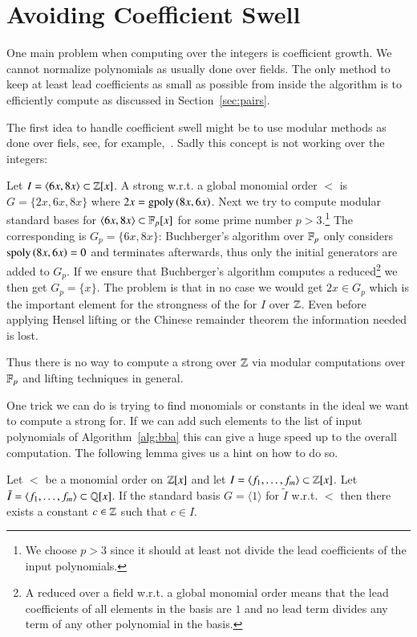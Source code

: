 \section{Avoiding Coefficient Swell}
\label{sec:coefficients}
One main problem when computing over the integers is coefficient growth. We
cannot normalize polynomials as usually done over fields. The only method to
keep at least lead coefficients as small as possible from inside the algorithm
is to efficiently compute \gpts as discussed in Section~\ref{sec:pairs}.

The first idea to handle coefficient swell might be to use modular methods as
done over fiels, see, for example,~\cite{arnoldModular2003}. Sadly this concept
is not working over the integers:

\begin{example}
Let $I = \langle 6x, 8x \rangle \subset \mathbb{Z}[x]$. A strong \stb w.r.t. a global
monomial order $<$ is $G = \{2x,6x,8x\}$ where $2x = \mathrm{gpoly}\left({8x},{6x}\right)$. Next we try to
compute modular standard bases for $\langle 6x, 8x \rangle \subset \mathbb{F}_p[x]$
for some prime number $p > 3$.\footnote{We choose $p>3$ since it should at least
not divide the lead coefficients of the input polynomials.} The corresponding
\stb is $G_p = \{6x,8x\}$: Buchberger's algorithm over $\mathbb{F}_p$ only considers
$\mathrm{spoly}\left({8x},{6x}\right) = 0$ and terminates afterwards, thus only the initial generators
are added to $G_p$. If
we ensure that Buchberger's algorithm computes a reduced\footnote{A
reduced \stb over a field w.r.t. a global monomial order means that the lead
coefficients of all elements in the basis are $1$ and no lead term divides
any term of any other polynomial in the basis.} \stb we then get $G_p =
\{x\}$. The problem is that in no case we would get $2x \in G_p$ which is
the important element for the strongness of the \stb for $I$ over $\mathbb{Z}$. Even
before applying Hensel lifting or the Chinese remainder theorem the information
needed is lost.

Thus there is no way to compute a strong \stb over $\mathbb{Z}$ via modular computations
over $\mathbb{F}_p$ and lifting techniques in general.
\end{example}

One trick we can do is trying to find monomials or constants in the ideal we
want to compute a strong \stb for. If we can add such elements to the list of
input polynomials of Algorithm~\ref{alg:bba} this can give a huge speed up to
the overall computation. The following lemma gives us a hint on how to do so.

\begin{lemma}
Let $<$ be a monomial order on $\mathbb{Z}[x]$ and let
$I=\langle f_1,\ldots, f_m\rangle \subset \mathbb{Z}[x]$. Let $\tilde I = \langle
f_1,\ldots, f_m\rangle \subset \mathbb{Q}[x]$. If the standard basis $G = \langle 1
\rangle $ for $\tilde I$ w.r.t. $<$ then there exists a constant $c \in \mathbb{Z}$
such that $c \in I$.
\label{lem:syz-coeff}
\end{lemma}

